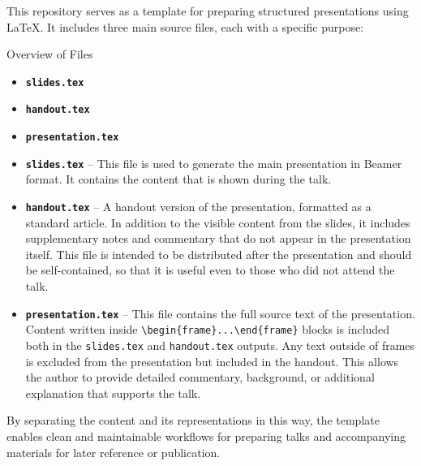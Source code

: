 This repository serves as a template for preparing structured presentations using \LaTeX. It includes three main source files, each with a specific purpose:

\begin{frame}[fragile]{Overview of Files}
  \begin{itemize}
   \item \textbf{\texttt{slides.tex}} 
   \item \textbf{\texttt{handout.tex}}
   \item \textbf{\texttt{presentation.tex}}
  \end{itemize}
\end{frame}
\begin{itemize}
  \item \textbf{\texttt{slides.tex}} – This file is used to generate the main presentation in Beamer format. It contains the content that is shown during the talk.
  
  \item \textbf{\texttt{handout.tex}} – A handout version of the presentation, formatted as a standard article. In addition to the visible content from the slides, it includes supplementary notes and commentary that do not appear in the presentation itself. This file is intended to be distributed after the presentation and should be self-contained, so that it is useful even to those who did not attend the talk.
  
  \item \textbf{\texttt{presentation.tex}} – This file contains the full source text of the presentation. Content written inside \verb|\begin{frame}...\end{frame}| blocks is included both in the \texttt{slides.tex} and \texttt{handout.tex} outputs. Any text outside of frames is excluded from the presentation but included in the handout. This allows the author to provide detailed commentary, background, or additional explanation that supports the talk.
\end{itemize}

By separating the content and its representations in this way, the template
enables clean and maintainable workflows for preparing talks and accompanying
materials for later reference or publication.

